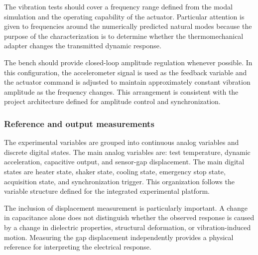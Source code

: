 \documentclass[conference]{IEEEtran}
\begin{document}
The vibration tests should cover a frequency range defined from the modal simulation and the operating capability of the actuator. Particular attention is given to frequencies around the numerically predicted natural modes because the purpose of the characterization is to determine whether the thermomechanical adapter changes the transmitted dynamic response.

The bench should provide closed-loop amplitude regulation whenever possible. In this configuration, the accelerometer signal is used as the feedback variable and the actuator command is adjusted to maintain approximately constant vibration amplitude as the frequency changes. This arrangement is consistent with the project architecture defined for amplitude control and synchronization.

\subsubsection{Reference and output measurements}

The experimental variables are grouped into continuous analog variables and discrete digital states. The main analog variables are: test temperature, dynamic acceleration, capacitive output, and sensor-gap displacement. The main digital states are heater state, shaker state, cooling state, emergency stop state, acquisition state, and synchronization trigger. This organization follows the variable structure defined for the integrated experimental platform.

The inclusion of displacement measurement is particularly important. A change in capacitance alone does not distinguish whether the observed response is caused by a change in dielectric properties, structural deformation, or vibration-induced motion. Measuring the gap displacement independently provides a physical reference for interpreting the electrical response.
\end{document}
